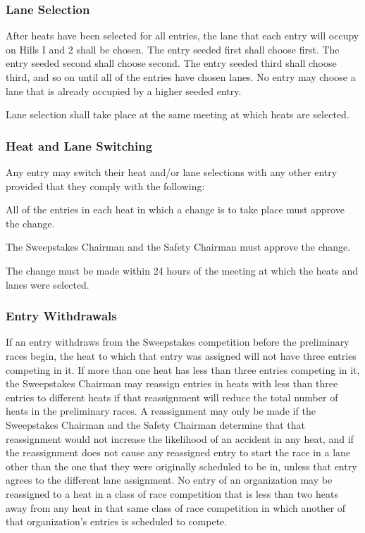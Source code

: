 \subsubsection{Lane Selection}

After heats have been selected for all entries, the lane that each entry will occupy on Hills I and 2 shall be chosen. The entry seeded first shall choose first. The entry seeded second shall choose second. The entry seeded third shall choose third, and so on until all of the entries have chosen lanes. No entry may choose a lane that is already occupied by a higher seeded entry.

Lane selection shall take place at the same meeting at which heats are selected.

\subsubsection{Heat and Lane Switching}

Any entry may switch their heat and/or lane selections with any other entry provided that they comply with the following:

All of the entries in each heat in which a change is to take place must approve the change.

The Sweepstakes Chairman and the Safety Chairman must approve the change.

The change must be made within 24 hours of the meeting at which the heats and lanes were selected.

\subsubsection{Entry Withdrawals}

If an entry withdraws from the Sweepstakes competition before the preliminary races begin, the heat to which that entry was assigned will not have three entries competing in it. If more than one heat has less than three entries competing in it, the Sweepstakes Chairman may reassign entries in heats with less than three entries to different heats if that reassignment will reduce the total number of heats in the preliminary races. A reassignment may only be made if the Sweepstakes Chairman and the Safety Chairman determine that that reassignment would not increase the likelihood of an accident in any heat, and if the reassignment does not cause any reassigned entry to start the race in a lane other than the one that they were originally scheduled to be in, unless that entry agrees to the different lane assignment. No entry of an organization may be reassigned to a heat in a class of race competition that is less than two heats away from any heat in that same class of race competition in which another of that organization's entries is scheduled to compete.

